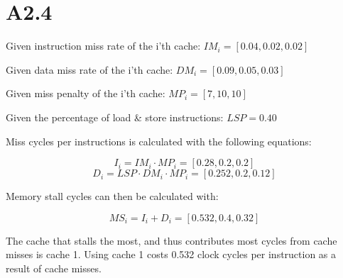 \section*{A2.4}
Given instruction miss rate of the i'th cache: $IM_i = [0.04, 0.02, 0.02]$

Given data miss rate of the i'th cache: $DM_i = [0.09, 0.05, 0.03]$

Given miss penalty of the i'th cache: $MP_i = [7, 10, 10]$

Given the percentage of load \& store instructions: $LSP = 0.40$

Miss cycles per instructions is calculated with the following equations:

$$ I_i = IM_i \cdot MP_i = [0.28, 0.2, 0.2] $$
$$ D_i = LSP \cdot DM_i \cdot MP_i = [0.252, 0.2, 0.12] $$

Memory stall cycles can then be calculated with:

$$ MS_i = I_i + D_i = [0.532, 0.4, 0.32] $$

The cache that stalls the most, and thus contributes most cycles from cache misses is cache 1.
Using cache 1 costs 0.532 clock cycles per instruction as a result of cache misses.